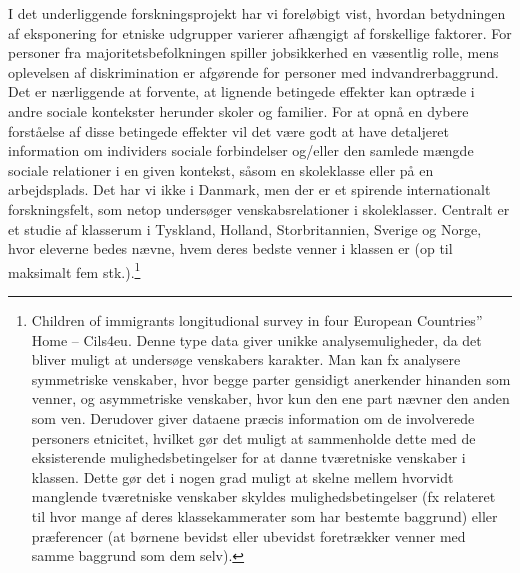 \documentclass[
]{book}
\begin{document}
I det underliggende forskningsprojekt har vi foreløbigt vist, hvordan betydningen af eksponering for etniske udgrupper varierer afhængigt af forskellige faktorer. For personer fra majoritetsbefolkningen spiller jobsikkerhed en væsentlig rolle, mens oplevelsen af diskrimination er afgørende for personer med indvandrerbaggrund. Det er nærliggende at forvente, at lignende betingede effekter kan optræde i andre sociale kontekster herunder skoler og familier. For at opnå en dybere forståelse af disse betingede effekter vil det være godt at have detaljeret information om individers sociale forbindelser og/eller den samlede mængde sociale relationer i en given kontekst, såsom en skoleklasse eller på en arbejdsplads. Det har vi ikke i Danmark, men der er et spirende internationalt forskningsfelt, som netop undersøger venskabsrelationer i skoleklasser. Centralt er et studie af klasserum i Tyskland, Holland, Storbritannien, Sverige og Norge, hvor eleverne bedes nævne, hvem deres bedste venner i klassen er (op til maksimalt fem stk.).\footnote{Children of immigrants longitudional survey in four European Countries'' Home -- Cils4eu. Denne type data giver unikke analysemuligheder, da det bliver muligt at undersøge venskabers karakter. Man kan fx analysere symmetriske venskaber, hvor begge parter gensidigt anerkender hinanden som venner, og asymmetriske venskaber, hvor kun den ene part nævner den anden som ven. Derudover giver dataene præcis information om de involverede personers etnicitet, hvilket gør det muligt at sammenholde dette med de eksisterende mulighedsbetingelser for at danne tværetniske venskaber i klassen. Dette gør det i nogen grad muligt at skelne mellem hvorvidt manglende tværetniske venskaber skyldes mulighedsbetingelser (fx relateret til hvor mange af deres klassekammerater som har bestemte baggrund) eller præferencer (at børnene bevidst eller ubevidst foretrækker venner med samme baggrund som dem selv).}
\end{document}
